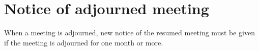 \section{Notice of adjourned meeting}

When a meeting is adjourned, new notice of the resumed meeting must be given if the meeting is adjourned for one month or more. 